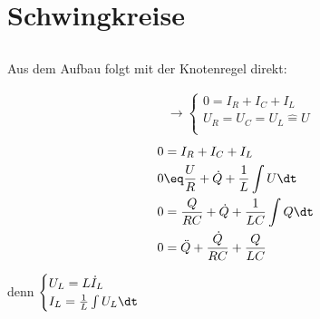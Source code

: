 \documentclass[11pt]{article}
\begin{document}
\section{Schwingkreise}
\subsection{}
\begin{adjustwidth}{20pt}{}
    Aus dem Aufbau folgt mit der Knotenregel direkt:
\end{adjustwidth}
\begin{align*}
    &\rightarrow \begin{cases}
        0 = I_R + I_C + I_L\\
        U_R=U_C=U_L \hat = U\\
    \end{cases}
\end{align*}
\begin{align*}
    0 &= I_R + I_C + I_L\\
    0 &\eq \frac{U}{R} + \dot Q + \frac 1L \int U\dt \\
    0 &= \frac{Q}{R C} + \dot Q  + \frac 1{LC} \int Q\dt \\
    0 &= \ddot Q + \frac{\dot Q}{R C} + \frac Q{LC} \\
\end{align*}
\begin{adjustwidth}{20pt}{}
    \con denn \(\begin{cases}
        U_L = L \dot I_L\\
        I_L = \frac 1L \int U_L\dt\\
    \end{cases}\)
\end{adjustwidth}
\end{document}
